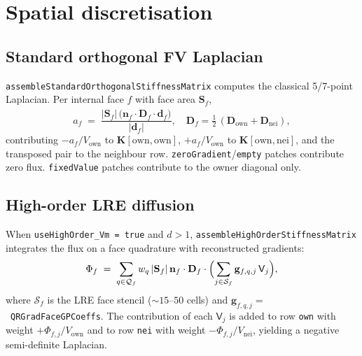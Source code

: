 \documentclass[11pt,a4paper]{article}
\newcommand{\code}[1]{\texttt{\small #1}}
\newcommand{\Dten}{\mathbf{D}}
\newcommand{\Kstif}{\mathbf{K}}
\begin{document}
\section{Spatial discretisation}

\subsection{Standard orthogonal FV Laplacian}

\code{assembleStandardOrthogonalStiffnessMatrix} computes the classical
5/7-point Laplacian. Per internal face $f$ with face area $\mathbf{S}_{f}$,
\begin{equation}
  a_{f} \;=\;
   \frac{ \lvert \mathbf{S}_{f} \rvert\,
          \bigl( \mathbf{n}_{f} \cdot \Dten_{f} \cdot \hat{\mathbf{d}}_{f} \bigr) }
        { \lvert \mathbf{d}_{f} \rvert },
   \quad
   \Dten_{f} = \tfrac{1}{2}\,(\Dten_{\text{own}} + \Dten_{\text{nei}}),
\end{equation}
contributing $-a_{f}/V_{\text{own}}$ to $\Kstif[\text{own},\text{own}]$,
$+a_{f}/V_{\text{own}}$ to $\Kstif[\text{own},\text{nei}]$, and the
transposed pair to the neighbour row. \code{zeroGradient}/\code{empty}
patches contribute zero flux. \code{fixedValue} patches contribute to
the owner diagonal only.

\subsection{High-order LRE diffusion}

When \code{useHighOrder\_Vm = true} and $d>1$,
\code{assembleHighOrderStiffnessMatrix} integrates the flux on a face
quadrature with reconstructed gradients:
\begin{equation}
  \Phi_{f} \;=\;
   \sum_{q \in \mathcal{Q}_{f}}
       w_{q}\, \lvert \mathbf{S}_{f} \rvert\,
       \mathbf{n}_{f} \cdot \Dten_{f} \cdot
       \Bigl(
         \sum_{j \in \mathcal{S}_{f}}
            \mathbf{g}_{f,q,j}\, \mathsf{V}_{j}
       \Bigr),
   \label{eq:HO-flux}
\end{equation}
where $\mathcal{S}_{f}$ is the LRE face stencil ($\sim 15$--$50$ cells)
and $\mathbf{g}_{f,q,j} = $~\code{QRGradFaceGPCoeffs}. The
contribution of each $\mathsf{V}_{j}$ is added to row \code{own} with
weight $+\Phi_{f,j}/V_{\text{own}}$ and to row \code{nei} with weight
$-\Phi_{f,j}/V_{\text{nei}}$, yielding a negative semi-definite
Laplacian.
\end{document}
